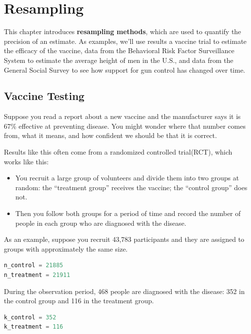 \hypertarget{resampling}{%
\chapter{Resampling}\label{resampling}}

This chapter introduces \textbf{resampling methods}, which are used to
quantify the precision of an estimate. As examples, we'll use results a
vaccine trial to estimate the efficacy of the vaccine, data from the
Behavioral Risk Factor Surveillance System to estimate the average
height of men in the U.S., and data from the General Social Survey to
see how support for gun control has changed over time.

\hypertarget{vaccine-testing}{%
\section{Vaccine Testing}\label{vaccine-testing}}

Suppose you read a report about a new vaccine and the manufacturer says
it is 67\% effective at preventing disease. You might wonder where that
number comes from, what it means, and how confident we should be that it
is correct.

Results like this often come from a randomized controlled trial(RCT),
which works like this:

\begin{itemize}
\item
  You recruit a large group of volunteers and divide them into two
  groups at random: the ``treatment group'' receives the vaccine; the
  ``control group'' does not.
\item
  Then you follow both groups for a period of time and record the number
  of people in each group who are diagnosed with the disease.
\end{itemize}

As an example, suppose you recruit 43,783 participants and they are
assigned to groups with approximately the same size.

\begin{lstlisting}[language=Python,style=source]
n_control = 21885
n_treatment = 21911
\end{lstlisting}

During the observation period, 468 people are diagnosed with the
disease: 352 in the control group and 116 in the treatment group.

\begin{lstlisting}[language=Python,style=source]
k_control = 352
k_treatment = 116
\end{lstlisting}

